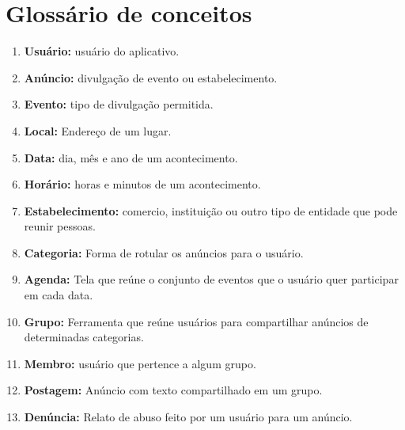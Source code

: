 \documentclass{article}
\begin{document}
\section{Glossário de conceitos}
    
\begin{enumerate}[label=\textbf{\arabic*}]
\item \textbf{Usuário:} usuário do aplicativo.
\item \textbf{Anúncio:} divulgação de evento ou estabelecimento.
\item \textbf{Evento:} tipo de divulgação permitida.
\item \textbf{Local:} Endereço de um lugar.
\item \textbf{Data:} dia, mês e ano de um acontecimento.
\item \textbf{Horário:} horas e minutos de um acontecimento.
\item \textbf{Estabelecimento:} comercio, instituição ou outro tipo de entidade que pode reunir pessoas.
\item \textbf{Categoria:} Forma de rotular os anúncios para o usuário.
\item \textbf{Agenda:} Tela que reúne o conjunto de eventos que o usuário quer participar em cada data.
\item \textbf{Grupo:} Ferramenta que reúne usuários para compartilhar anúncios de determinadas categorias.
\item \textbf{Membro:} usuário que pertence a algum grupo.
\item \textbf{Postagem:} Anúncio com texto compartilhado em um grupo.
\item \textbf{Denúncia:} Relato de abuso feito por um usuário para um anúncio.
\end{enumerate}
\end{document}
